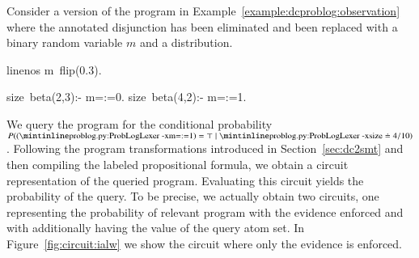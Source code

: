 \begin{example}
\label{example:eval_observation}

Consider a version of the program in Example~\ref{example:dcproblog:observation} where the annotated disjunction has been eliminated and been replaced with a binary random variable $m$ and a  distribution.
	\begin{problog*}{linenos}
m~flip(0.3).

size~beta(2,3):- m=:=0.
size~beta(4,2):- m=:=1.
	\end{problog*}
We query the program for the conditional probability $P((\mathprobloginline{m=:=1}) =\top \mid \mathprobloginline{size}\doteq 4/10 )$.
Following the program transformations introduced in Section~\ref{sec:dc2smt} and then compiling the labeled propositional formula, we obtain a circuit representation of the queried program. Evaluating this circuit yields the probability of the query. To be precise, we actually obtain two circuits, one representing the probability of relevant program with the evidence enforced and with additionally having the value of the query atom set. 
In Figure~\ref{fig:circuit:ialw} we show the circuit where only the evidence is enforced.




	\begin{figure}[h]
\end{figure}
\end{example}
